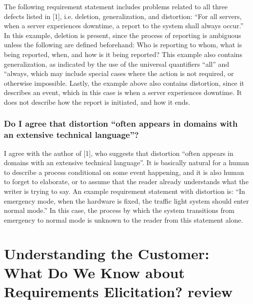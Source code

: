 \documentclass[letterpaper,12pt]{article}
\begin{document}
The following requirement statement includes problems related to all three
defects listed in [1], i.e. deletion, generalization, and distortion: ``For all
servers, when a server experiences downtime, a report to the system shall always
occur.'' In this example, deletion is present, since the process of reporting is
ambiguous unless the following are defined beforehand: Who is reporting to whom,
what is being reported, when, and how is it being reported? This example also
contains generalization, as indicated by the use of the universal quantifiers
``all'' and ``always, which may include special cases where the action is not
required, or otherwise impossible. Lastly, the example above also contains
distortion, since it describes an event, which in this case is when a server
experiences downtime. It does not describe how the report is initiated, and how
it ends.


\subsubsection{Do I agree that distortion “often appears in domains with an extensive technical language”?}

I agree with the author of [1], who suggests that distortion ``often appears in
domains with an extensive technical language''. It is basically natural for a
human to describe a process conditional on some event happening, and it is also
human to forget to elaborate, or to assume that the reader already understands
what the writer is trying to say. An example requirement statement with
distortion is: ``In emergency mode, when the hardware is fixed, the traffic
light system should enter normal mode.'' In this case, the process by which the
system transitions from emergency to normal mode is unknown to the reader from
this statement alone.

\section{Understanding the Customer: What Do We Know
  about Requirements Elicitation? review}
\end{document}

